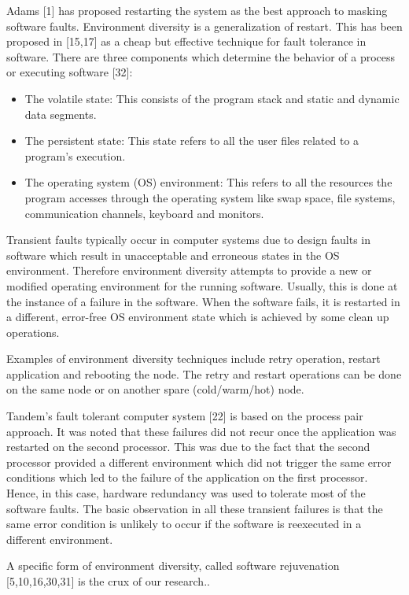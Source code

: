 \documentclass[a4paper, 11pt]{article}
\begin{document}
Adams [1] has proposed restarting the system as the best approach to masking software faults. Environment diversity is a generalization of restart. This has been proposed in [15,17] as a cheap but effective technique for fault tolerance in software. There are three components which determine the behavior of a process or executing software [32]:

\begin{itemize}
\item The volatile state: This consists of the program stack and static and dynamic data segments.
\item The persistent state: This state refers to all the user files related to a program's execution.
\item The operating system (OS) environment: This refers to all the resources the program accesses through the operating system like swap space, file systems, communication channels, keyboard and monitors.
\end{itemize}

Transient faults typically occur in computer systems due to design faults in software which result in unacceptable and erroneous states in the OS environment. Therefore environment diversity attempts to provide a new or modified operating environment for the running software. Usually, this is done at the instance of a failure in the software. When the software fails, it is restarted in a different, error-free OS environment state which is achieved by some clean up operations.

Examples of environment diversity techniques include retry operation, restart application and rebooting the node. The retry and restart operations can be done on the same node or on another spare (cold/warm/hot) node.

Tandem's fault tolerant computer system [22] is based on the process pair approach. It was noted that these failures did not recur once the application was restarted on the second processor. This was due to the fact that the second processor provided a different environment which did not trigger the same error conditions which led to the failure of the application on the first processor. Hence, in this case, hardware redundancy was used to tolerate most of the software faults. The basic observation in all these transient failures is that the same error condition is unlikely to occur if the software is reexecuted in a different environment.

A specific form of environment diversity, called software rejuvenation [5,10,16,30,31] is the crux of our research..
\end{document}

